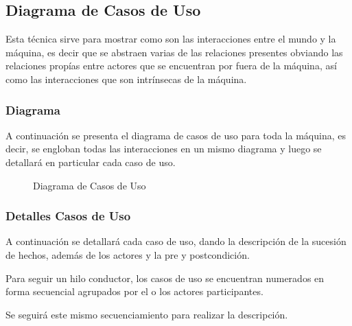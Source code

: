 \documentclass[a4paper,10pt]{article}
\begin{document}
\subsection*{Diagrama de Casos de Uso}

Esta t\'ecnica sirve para mostrar como son las interacciones entre el mundo y la m\'aquina, es decir que se abstraen varias de las relaciones presentes
obviando las relaciones prop\'ias entre actores que se encuentran por fuera de la m\'aquina, as\'i como las interacciones que son intr\'insecas de la m\'aquina.

\subsubsection*{Diagrama}

A continuaci\'on se presenta el diagrama de casos de uso para toda la m\'aquina, es decir, se engloban todas las interacciones en un mismo diagrama
y luego se detallar\'a en particular cada caso de uso.


\begin{figure}[H]
\centering
{}
\caption{Diagrama de Casos de Uso}
\end{figure}


\subsubsection*{Detalles Casos de Uso}

A continuaci\'on se detallar\'a cada caso de uso, dando la descripci\'on de la sucesi\'on de hechos, adem\'as de los actores y la pre y postcondici\'on.

Para seguir un hilo conductor, los casos de uso se encuentran numerados en forma secuencial agrupados por el o los actores participantes.

Se seguir\'a este mismo secuenciamiento para realizar la descripci\'on.
\end{document}

